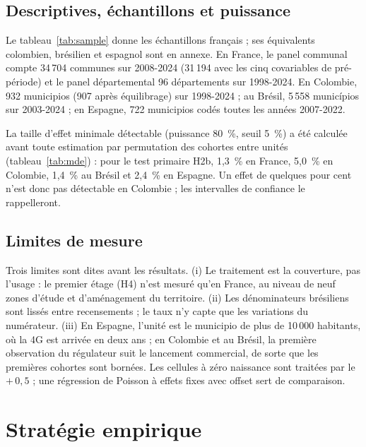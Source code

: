 \documentclass[11pt,a4paper]{article}
\begin{document}
\subsection{Descriptives, échantillons et puissance}

Le tableau~\ref{tab:sample} donne les échantillons français ; ses équivalents colombien, brésilien et espagnol sont en annexe. En France, le panel communal compte 34\,704 communes sur 2008-2024 (31\,194 avec les cinq covariables de pré-période) et le panel départemental 96 départements sur 1998-2024. En Colombie, 932 municipios (907 après équilibrage) sur 1998-2024 ; au Brésil, 5\,558 municípios sur 2003-2024 ; en Espagne, 722 municipios codés toutes les années 2007-2022.

La taille d'effet minimale détectable (puissance 80~\%, seuil 5~\%) a été calculée avant toute estimation par permutation des cohortes entre unités (tableau~\ref{tab:mde}) : pour le test primaire H2b, 1,3~\% en France, 5,0~\% en Colombie, 1,4~\% au Brésil et 2,4~\% en Espagne. Un effet de quelques pour cent n'est donc pas détectable en Colombie ; les intervalles de confiance le rappelleront.




\subsection{Limites de mesure}

Trois limites sont dites avant les résultats. (i) Le traitement est la couverture, pas l'usage : le premier étage (H4) n'est mesuré qu'en France, au niveau de neuf zones d'étude et d'aménagement du territoire. (ii) Les dénominateurs brésiliens sont lissés entre recensements ; le taux n'y capte que les variations du numérateur. (iii) En Espagne, l'unité est le municipio de plus de 10\,000 habitants, où la 4G est arrivée en deux ans ; en Colombie et au Brésil, la première observation du régulateur suit le lancement commercial, de sorte que les premières cohortes sont bornées. Les cellules à zéro naissance sont traitées par le $+\,0{,}5$ ; une régression de Poisson à effets fixes avec offset sert de comparaison.

\section{Stratégie empirique}
\end{document}
